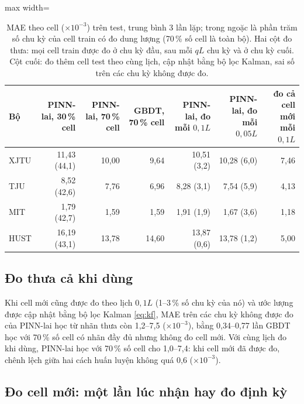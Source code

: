 \documentclass[12pt,a4paper,oneside]{report}
\theoremstyle{plain}
\theoremstyle{definition}
\begin{document}
\begin{table}[!htbp]\centering\small
\caption[MAE theo cell theo ngân sách đo dung lượng]{MAE theo cell ($\times10^{-3}$) trên test, trung bình 3 lần lặp; trong ngoặc là phần trăm số chu kỳ của cell train có đo dung lượng (70\,\% số cell là toàn bộ). Hai cột đo thưa: mọi cell train được đo ở chu kỳ đầu, sau mỗi $qL$ chu kỳ và ở chu kỳ cuối. Cột cuối: đo thêm cell test theo cùng lịch, cập nhật bằng bộ lọc Kalman, sai số trên các chu kỳ không được đo.}\label{tab:e28}
\begin{adjustbox}{max width=\textwidth}\begin{tabular}{lrrrrrr}\toprule
Bộ & PINN-lai, 30\,\% cell & PINN-lai, 70\,\% cell & GBDT, 70\,\% cell & PINN-lai, đo mỗi $0{,}1L$ & PINN-lai, đo mỗi $0{,}05L$ & đo cả cell mới mỗi $0{,}1L$ \\\midrule
XJTU & 11{,}43 (44{,}1) & 10{,}00 & 9{,}64 & 10{,}51 (3{,}2) & 10{,}28 (6{,}0) & 7{,}46 \\
TJU & 8{,}52 (42{,}6) & 7{,}76 & 6{,}96 & 8{,}28 (3{,}1) & 7{,}54 (5{,}9) & 4{,}13 \\
MIT & 1{,}79 (42{,}7) & 1{,}59 & 1{,}59 & 1{,}91 (1{,}9) & 1{,}67 (3{,}6) & 1{,}18 \\
HUST & 16{,}19 (43{,}1) & 13{,}78 & 14{,}60 & 13{,}87 (0{,}6) & 13{,}78 (1{,}2) & 5{,}00 \\
\bottomrule\end{tabular}\end{adjustbox}\end{table}


\subsection{Đo thưa cả khi dùng}

Khi cell mới cũng được đo theo lịch $0{,}1L$ (1--3\,\% số chu kỳ của nó) và ước lượng được cập nhật bằng bộ lọc Kalman
\eqref{eq:kf}, MAE trên các chu kỳ không được đo của PINN-lai học từ nhãn thưa còn 1{,}2--7{,}5 ($\times10^{-3}$), bằng
0{,}34--0{,}77 lần GBDT học với 70\,\% số cell có nhãn đầy đủ nhưng không đo cell mới. Với cùng lịch đo khi dùng,
PINN-lai học với 70\,\% số cell cho 1{,}0--7{,}4: khi cell mới đã được đo, chênh lệch giữa hai cách huấn luyện không quá
0{,}6 ($\times10^{-3}$).

\subsection{Đo cell mới: một lần lúc nhận hay đo định kỳ}\label{sec:kalmanres}
\end{document}
